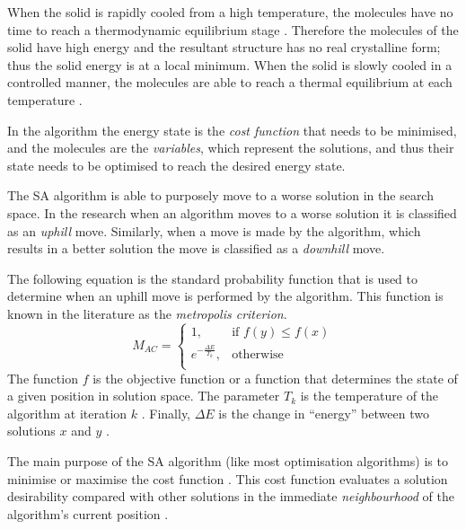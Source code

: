 When the solid is rapidly cooled from a high temperature, the molecules have no time to reach a thermodynamic equilibrium stage \cite{MobileRobotSA,ConstantTempSA}. Therefore the molecules of the solid have high energy and the resultant structure has no real crystalline form; thus the solid energy is at a local minimum\cite{CurveFittingSA,NewSAs,MobileRobotSA}. When the solid is slowly cooled in a controlled manner, the molecules are able to reach a thermal equilibrium at each temperature \cite{ChaosSA,CurveFittingSA,NewSAs}.

In the algorithm the energy state is the \emph{cost function} that needs to be minimised, and the molecules are the \emph{variables}, which represent the solutions, and thus their state needs to be optimised to reach the desired energy state.

The \gls{SA} algorithm is able to purposely move to a worse solution in the search space\cite{EcoEquilSA}. In the research when an algorithm moves to a worse solution it is classified as an \emph{uphill} move\cite{AIModernApproach}. Similarly, when a move is made by the algorithm, which results in a better solution the move is classified as a \emph{downhill} move\cite{AIModernApproach}.

The following equation is the standard probability function that is used to determine when an uphill move is performed by the algorithm. This function is known in the literature as the \emph{metropolis criterion}. 
\begin{equation}
\label{eq:saprobability}
	M_{AC} =
	\begin{cases}
	1, &\text{if $f(y) \leq f(x)$}\\
	e^{-\frac{\Delta E}{T_k}} , &\text{otherwise}\\
	\end{cases}
\end{equation}
The function $f$ is the objective function or a function that determines the state of a given position in solution space\cite{EcoEquilSA}. The parameter $T_k$ is the temperature of the algorithm at iteration $k$ \cite{EcoEquilSA}. Finally, $\Delta E$ is the change in ``energy'' between two solutions $x$ and $y$ \cite{EcoEquilSA}.

The main purpose of the \gls{SA} algorithm (like most optimisation algorithms) is to minimise or maximise the cost function \cite{SASingleMultiObj}. This cost function evaluates a solution desirability compared with other solutions in the immediate \emph{neighbourhood} of the algorithm's current position \cite{TheoPraticalSA}. 

